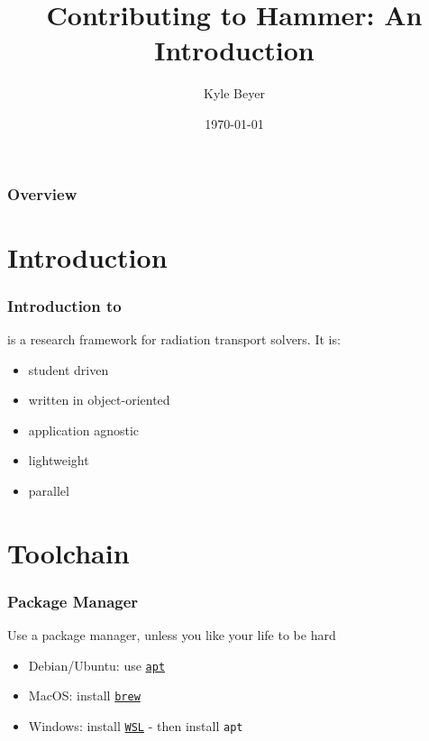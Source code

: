\documentclass{beamer}
\title[Contributing to Hammer]{Contributing to Hammer: An Introduction} %
\author{Kyle Beyer} %
\institute[UM] %
{
University of Michigan \\ %
\medskip
\textit{\href{mailto:beykyle@umich.edu}{beykyle@umich.edu}} %
}
\date{\today} %
\begin{document}
\begin{frame}
\titlepage %
\end{frame}

\begin{frame}
\frametitle{Overview} %
\tableofcontents 
\end{frame}


\section{Introduction}

\begin{frame}
  \frametitle{Introduction to \Hammer}

  \Hammer is a research framework for radiation transport solvers. It is:

  \begin{itemize}
    \item student driven
    \item written in object-oriented 
    \item application agnostic 
    \item lightweight
    \item parallel
  \end{itemize}
\end{frame}

\section{Toolchain}

\begin{frame}
\frametitle{Package Manager}
  
   Use a package manager, unless you like your life to be hard
  \begin{itemize}
    \item Debian/Ubuntu: use \href{https://help.ubuntu.com/lts/serverguide/apt.html}{\texttt{apt}}
    \item MacOS: install \href{https://brew.sh/}{\texttt{brew}}
    \item Windows: install 
      \href{https://docs.microsoft.com/en-us/windows/wsl/}{\texttt{WSL}} 
      - then install \texttt{apt}
  \end{itemize}
\end{frame}
\end{document}
